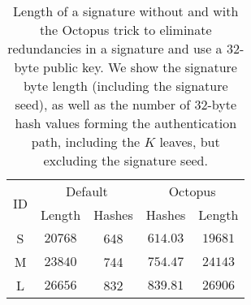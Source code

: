 \begin{table}
\centering 
\begin{tabular}{c|cc|cc}
\toprule
\multirow{2}{*}{ID} & 
\multicolumn{2}{c|}{Default} &
\multicolumn{2}{c}{Octopus} \\

& Length & Hashes & Hashes & Length \\
\midrule
S & $\num{20768}$ & 648 & $614.03$ & $\num{19681}$ \\
M & $\num{23840}$ & 744 & $754.47$ & $\num{24143}$ \\
L & $\num{26656}$ & 832 & $839.81$ & $\num{26906}$ \\
\bottomrule
\end{tabular}
\caption{Length of a signature without and with the Octopus trick to eliminate redundancies in a signature and use a 32-byte public key. We show the signature byte length (including the signature seed), as well as the number of 32-byte hash values forming the authentication path, including the $K$ leaves, but excluding the signature seed.}
\label{tab:octopus}
\end{table}


